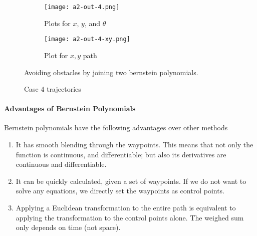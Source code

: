 \begin{figure}
    \centering
    \begin{subfigure}[b]{0.3\textwidth}
        \texttt{[image: a2-out-4.png]}
        \caption{Plots for $x$, $y$, and $\theta$}
    \end{subfigure}
    \begin{subfigure}[b]{0.5\textwidth}
        \texttt{[image: a2-out-4-xy.png]}
        \caption{Plot for $x, y$ path}
    \end{subfigure}
    \caption{Case 4 trajectories}
    \label{fig:case-4-traj}
    \small
        Avoiding obstacles by joining two bernstein polynomials.
\end{figure}

\paragraph{Advantages of Bernstein Polynomials}

Bernstein polynomials have the following advantages over other methods

\begin{enumerate}
    \item It has smooth blending through the waypoints. This means that not only the function is continuous, and differentiable; but also its derivatives are continuous and differentiable.
    \item It can be quickly calculated, given a set of waypoints. If we do not want to solve any equations, we directly set the waypoints as control points.
    \item Applying a Euclidean transformation to the entire path is equivalent to applying the transformation to the control points alone. The weighed sum only depends on time (not space).
\end{enumerate}
